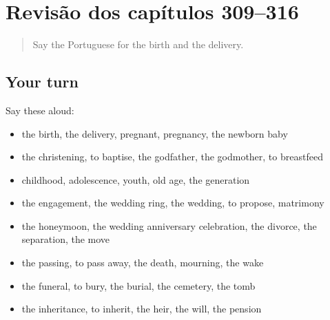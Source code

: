 \section[(dialogue)]{Revisão dos capítulos 309–316}

\label{lesson:PT-R316-revisao-309-316}



\begin{quote}
Say the Portuguese for the birth and the delivery.
\end{quote}

\subsection*{Your turn}
Say these aloud:

\begin{itemize}
\raggedright
  \item the birth, the delivery, pregnant, pregnancy, the newborn baby
  \item the christening, to baptise, the godfather, the godmother, to breastfeed
  \item childhood, adolescence, youth, old age, the generation
  \item the engagement, the wedding ring, the wedding, to propose, matrimony
  \item the honeymoon, the wedding anniversary celebration, the divorce, the separation, the move
  \item the passing, to pass away, the death, mourning, the wake
  \item the funeral, to bury, the burial, the cemetery, the tomb
  \item the inheritance, to inherit, the heir, the will, the pension
\end{itemize}

